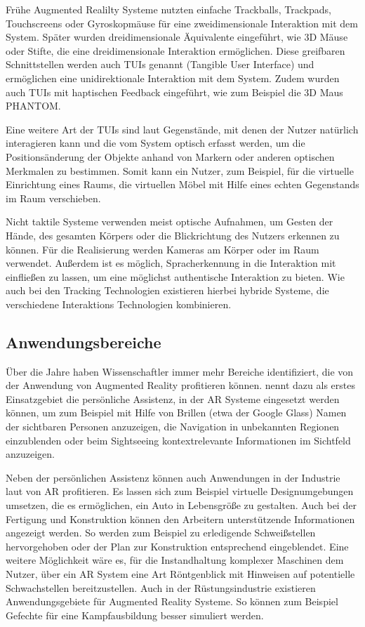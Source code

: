 Frühe Augmented Realilty Systeme nutzten einfache Trackballs, Trackpads, Touchscreens oder Gyroskopmäuse für eine zweidimensionale Interaktion mit dem System. Später wurden dreidimensionale Äquivalente eingeführt, wie 3D Mäuse oder Stifte, die eine dreidimensionale Interaktion ermöglichen. Diese greifbaren Schnittstellen werden auch TUIs genannt (Tangible User Interface) und ermöglichen eine unidirektionale Interaktion mit dem System. Zudem wurden auch TUIs mit haptischen Feedback eingeführt, wie zum Beispiel die 3D Maus PHANTOM. \citep{van2010survey} 

Eine weitere Art der TUIs sind laut \citet{azuma2001recent} Gegenstände, mit denen der Nutzer natürlich interagieren kann und die vom System optisch erfasst werden, um die Positionsänderung der Objekte anhand von Markern oder anderen optischen Merkmalen zu bestimmen. Somit kann ein Nutzer, zum Beispiel, für die virtuelle Einrichtung eines Raums, die virtuellen Möbel mit Hilfe eines echten Gegenstands im Raum verschieben. 

Nicht taktile Systeme verwenden meist optische Aufnahmen, um Gesten der Hände, des gesamten Körpers oder die Blickrichtung des Nutzers erkennen zu können. Für die Realisierung werden Kameras am Körper oder im Raum verwendet. Außerdem ist es möglich, Spracherkennung in die Interaktion mit einfließen zu lassen, um eine möglichst authentische Interaktion zu bieten. Wie auch bei den Tracking Technologien existieren hierbei hybride Systeme, die verschiedene Interaktions Technologien kombinieren. \citep{van2010survey} 

\subsection{Anwendungsbereiche}

Über die Jahre haben Wissenschaftler immer mehr Bereiche identifiziert, die von der Anwendung von Augmented Reality profitieren können. \citet{van2010survey} nennt dazu als erstes Einsatzgebiet die persönliche Assistenz, in der AR Systeme eingesetzt werden können, um zum Beispiel mit Hilfe von Brillen (etwa der Google Glass) Namen der sichtbaren Personen anzuzeigen, die Navigation in unbekannten Regionen einzublenden oder beim Sightseeing kontextrelevante Informationen im Sichtfeld anzuzeigen. 

Neben der persönlichen Assistenz können auch Anwendungen in der Industrie laut \citet{van2010survey} von AR profitieren. Es lassen sich zum Beispiel virtuelle Designumgebungen umsetzen, die es ermöglichen, ein Auto in Lebensgröße zu gestalten. Auch bei der Fertigung und Konstruktion können den Arbeitern unterstützende Informationen angezeigt werden. So werden zum Beispiel zu erledigende Schweißstellen hervorgehoben oder der Plan zur Konstruktion entsprechend eingeblendet. Eine weitere Möglichkeit wäre es, für die Instandhaltung komplexer Maschinen dem Nutzer, über ein AR System eine Art Röntgenblick mit Hinweisen auf potentielle Schwachstellen bereitzustellen. Auch in der Rüstungsindustrie existieren Anwendungsgebiete für Augmented Reality Systeme. So können zum Beispiel Gefechte für eine Kampfausbildung besser simuliert werden. \citep{azuma2001recent} 

